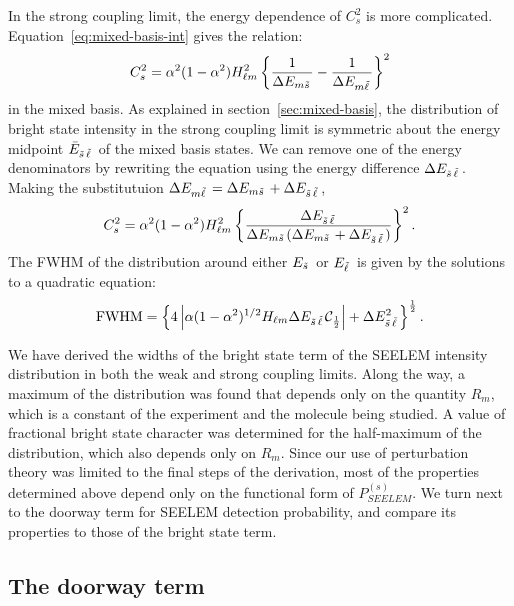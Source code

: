 In the strong coupling limit, the energy dependence of $C_s^2$ is more
complicated. Equation~\ref{eq:mixed-basis-int} gives the relation:
\begin{equation}
  C_s^2 = \alpha^2 (1-\alpha^2)H_{\ell m}^2
  \left \lbrace
    \frac{1}{\Delta E_{m \tilde{s}\,}} -
    \frac{1}{\Delta E_{m \tilde{\ell}\,}}
  \right \rbrace^2
\end{equation}
in the mixed basis.  As explained in section~\ref{sec:mixed-basis},
the distribution of bright state intensity in the strong coupling
limit is symmetric about the energy midpoint $\bar{E}_{\tilde{s}\, \tilde{\ell}\,}$ of
the mixed basis states.  We can remove one of the energy denominators
by rewriting the equation using the energy difference $\Delta E_{\tilde{s}\,
  \tilde{\ell}\,}$.  Making the substitutuion $\Delta E_{m \tilde{\ell}\,} = \Delta E_{m
  \tilde{s}\,} + \Delta E_{\tilde{s}\, \tilde{\ell}\,}$,
\begin{equation}
  C_s^2 = \alpha^2 (1-\alpha^2)H_{\ell m}^2
  \left \lbrace
    \frac{\Delta E_{\tilde{s}\, \tilde{\ell}\,}}
    {\Delta E_{m \tilde{s}\,}(\Delta E_{m \tilde{s}\,} + \Delta E_{\tilde{s}\, \tilde{\ell}\,})}
  \right \rbrace^2.
\end{equation}
The FWHM of the distribution around either $E_{\tilde{s}\,}$ or $E_{\tilde{\ell}\,}$ is
given by the solutions to a quadratic equation:
\begin{equation}
  \text{FWHM} = \left \lbrace
    4 \left \lvert
      \alpha (1-\alpha^2)^{1/2}H_{\ell m} \Delta E_{\tilde{s}\, \tilde{\ell}\,} 
      \mathcal{C}_{\frac{1}{2}}
      \right \rvert + \Delta E_{\tilde{s}\, \tilde{\ell}\,}^2
  \right \rbrace^{\frac{1}{2}}.
\end{equation}

We have derived the widths of the bright state term of the SEELEM
intensity distribution in both the weak and strong coupling limits.
Along the way, a maximum of the distribution was found that depends
only on the quantity $R_m$, which is a constant of the experiment and
the molecule being studied.  A value of fractional bright state
character was determined for the half-maximum of the distribution,
which also depends only on $R_m$.  Since our use of perturbation
theory was limited to the final steps of the derivation, most of the
properties determined above depend only on the functional form of
$P_{SEELEM}^{(s)}$.  We turn next to the doorway term for SEELEM
detection probability, and compare its properties to those of the bright state
term.

\subsection{The doorway term}

